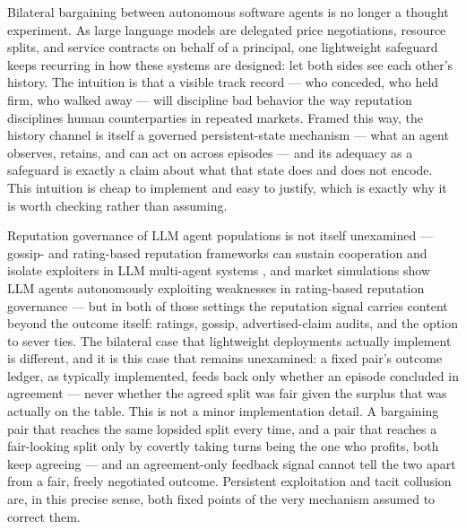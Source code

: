\documentclass[11pt]{article}
\begin{document}
Bilateral bargaining between autonomous software agents is no longer a thought experiment. As large language models are delegated price negotiations, resource splits, and service contracts on behalf of a principal, one lightweight safeguard keeps recurring in how these systems are designed: let both sides see each other's history. The intuition is that a visible track record --- who conceded, who held firm, who walked away --- will discipline bad behavior the way reputation disciplines human counterparties in repeated markets. Framed this way, the history channel is itself a governed persistent-state mechanism --- what an agent observes, retains, and can act on across episodes \citep{alwaysonagents2606} --- and its adequacy as a safeguard is exactly a claim about what that state does and does not encode. This intuition is cheap to implement and easy to justify, which is exactly why it is worth checking rather than assuming.

Reputation governance of LLM agent populations is not itself unexamined --- gossip- and rating-based reputation frameworks can sustain cooperation and isolate exploiters in LLM multi-agent systems \citep[RepuNet;][]{repunet2505}, and market simulations show LLM agents autonomously exploiting weaknesses in rating-based reputation governance \citep{truthmarkettwin2605} --- but in both of those settings the reputation signal carries content beyond the outcome itself: ratings, gossip, advertised-claim audits, and the option to sever ties. The bilateral case that lightweight deployments actually implement is different, and it is this case that remains unexamined: a fixed pair's outcome ledger, as typically implemented, feeds back only whether an episode concluded in agreement --- never whether the agreed split was fair given the surplus that was actually on the table. This is not a minor implementation detail. A bargaining pair that reaches the same lopsided split every time, and a pair that reaches a fair-looking split only by covertly taking turns being the one who profits, both keep agreeing --- and an agreement-only feedback signal cannot tell the two apart from a fair, freely negotiated outcome. Persistent exploitation and tacit collusion are, in this precise sense, both fixed points of the very mechanism assumed to correct them.
\end{document}
